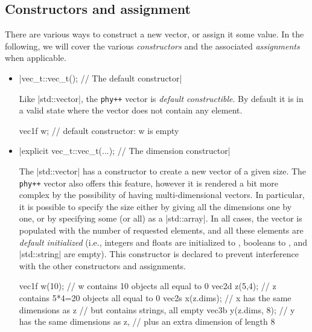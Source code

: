\documentclass[12pt]{report}
\newcommand{\phypp}{\texttt{phy++}\xspace}
\newcommand{\stdvec}{\cppinline|std::vector|\xspace}
\newenvironment{example}
{
    \begin{mdframed}[style=example,frametitle={Example}]
}
{
    \end{mdframed}
}
\begin{document}
\subsection{Constructors and assignment \label{SEC:core:vec:constructor}}

There are various ways to construct a new vector, or assign it some value. In the following, we will cover the various \emph{constructors} and the associated \emph{assignments} when applicable.

\begin{itemize}
\item \cppinline|vec_t::vec_t(); // The default constructor|

Like \stdvec, the \phypp vector is \emph{default constructible}. By default it is in a valid state where the vector does not contain any element.

\begin{example}
\begin{cppcode}
vec1f w; // default constructor: w is empty
\end{cppcode}
\end{example}

\item \cppinline|explicit vec_t::vec_t(...); // The dimension constructor|

The \stdvec has a constructor to create a new vector of a given size. The \phypp vector also offers this feature, however it is rendered a bit more complex by the possibility of having multi-dimensional vectors. In particular, it is possible to specify the size either by giving all the dimensions one by one, or by specifying some (or all) as a \cppinline|std::array|. In all cases, the vector is populated with the number of requested elements, and all these elements are \emph{default initialized} (i.e., integers and floats are initialized to , booleans to , and \cppinline|std::string| are empty). This constructor is declared  to prevent interference with the other constructors and assignments.

\begin{example}
\begin{cppcode}
vec1f w(10);     // w contains 10 objects all equal to 0
vec2d z(5,4);    // z contains 5*4=20 objects all equal to 0
vec2s x(z.dims); // x has the same dimensions as z
                 // but contains strings, all empty
vec3b y(z.dims, 8); // y has the same dimensions as z,
                 // plus an extra dimension of length 8
\end{cppcode}
\end{example}


\end{itemize}
\end{document}
